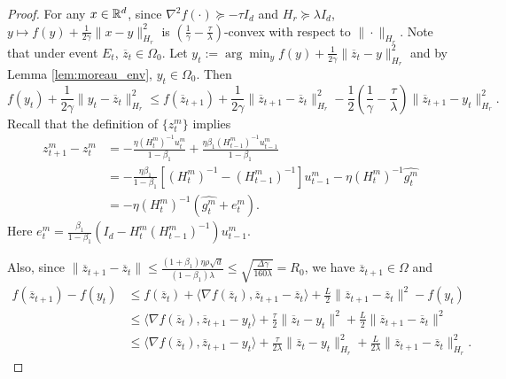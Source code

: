 \documentclass{article} %
\numberwithin{equation}{section}
\begin{document}
\begin{proof}
    For any $x\in \mathbb{R}^d$, since $\nabla^2 f(\cdot)\succeq -\tau I_d$ and $H_r\succeq \lambda I_d$, $y\mapsto f(y)+\frac{1}{2\gamma} \|x-y\|^2_{H_r}$ is $(\frac{1}{\gamma}-\frac{\tau}{\lambda})$-convex with respect to $\|\cdot\|_{H_r}$. 
    Note that under event $E_t$, $\overline{z}_t\in\Omega_0$.
    Let $y_t:=\arg\min_y f(y)+\frac{1}{2\gamma} \|\overline{z}_t-y\|^2_{H_{r}}$ and by Lemma \ref{lem:moreau_env}, $y_t\in \Omega_0$. Then
    \begin{equation}\label{eq:22}
        f(y_t) + \frac{1}{2\gamma}\|y_t-\overline{z}_t\|_{H_r}^2 
        \leq f(\overline{z}_{t+1}) + \frac{1}{2\gamma}\|\overline{z}_{t+1}-\overline{z}_t\|_{H_r}^2-\frac{1}{2}(\frac{1}{\gamma}-\frac{\tau}{\lambda})\|\overline{z}_{t+1}-y_t\|_{H_r}^2.
    \end{equation}
    Recall that the definition of $\{z_t^m\}$ implies 
    \begin{equation}
        \begin{aligned}
            z_{t+1}^m-z_t^m 
            & = -\frac{\eta(H_t^m)^{-1}u_t^m}{1-\beta_1} + \frac{\eta\beta_1(H_{t-1}^m)^{-1}u_{t-1}^m}{1-\beta_1} \\
            & = -\frac{\eta\beta_1}{1-\beta_1}[(H_t^m)^{-1}-(H_{t-1}^m)^{-1}]u_{t-1}^m - \eta (H_t^m)^{-1}\widehat{g_t^m} \\
            & = -\eta (H_t^m)^{-1}(\widehat{g_t^m}+e_t^m).
        \end{aligned}
    \end{equation}
    Here $e_t^m=\frac{\beta_1}{1-\beta_1}(I_d-H_t^m(H_{t-1}^m)^{-1})u_{t-1}^m$.
    
    Also, since $\|\overline{z}_{t+1}-\overline{z}_t\| \leq \frac{(1+\beta_1)\eta\rho\sqrt{d}}{(1-\beta_1)\lambda}\leq \sqrt{\frac{\Delta\gamma}{160\lambda}}=R_0$, we have $\overline{z}_{t+1}\in\Omega$ and
    \begin{equation}
        \begin{aligned}
            f(\overline{z}_{t+1})-f(y_t)
            &\leq f(\overline{z}_t) + \langle \nabla f(\overline{z}_t), \overline{z}_{t+1}-\overline{z}_t\rangle + \frac{L}{2}\|\overline{z}_{t+1}-\overline{z}_t\|^2 - f(y_t) \\
            &\leq \langle \nabla f(\overline{z}_t), \overline{z}_{t+1}-y_t\rangle + \frac{\tau}{2}\|\overline{z}_t-y_t\|^2+\frac{L}{2}\|\overline{z}_{t+1}-\overline{z}_t\|^2 \\
            &\leq \langle \nabla f(\overline{z}_t), \overline{z}_{t+1}-y_t\rangle + \frac{\tau}{2\lambda}\|\overline{z}_t-y_t\|_{H_r}^2+\frac{L}{2\lambda}\|\overline{z}_{t+1}-\overline{z}_t\|_{H_r}^2. 
        \end{aligned}
    \end{equation}
    

\end{proof}
\end{document}
